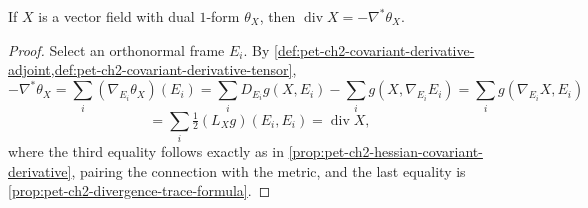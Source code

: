 \begin{proposition}
  \label{prop:pet-ch2-divergence-adjoint-formula}
  \leanok
  If $X$ is a vector field with dual $1$-form $\theta_X$, then
  $\operatorname{div}X=-\nabla^*\theta_X$.
\end{proposition}
\begin{proof}
  \leanok
  Select an orthonormal frame $E_i$. By
  \cref{def:pet-ch2-covariant-derivative-adjoint,def:pet-ch2-covariant-derivative-tensor},
  \[
    -\nabla^*\theta_X = \sum_i(\nabla_{E_i}\theta_X)(E_i)
    = \sum_iD_{E_i}g(X,E_i)-\sum_ig(X,\nabla_{E_i}E_i)
    = \sum_ig(\nabla_{E_i}X,E_i)
  \]
  \[
    = \sum_i\tfrac12(L_Xg)(E_i,E_i) = \operatorname{div}X,
  \]
  where the third equality follows exactly as in
  \cref{prop:pet-ch2-hessian-covariant-derivative}, pairing the connection
  with the metric, and the last equality is
  \cref{prop:pet-ch2-divergence-trace-formula}.
\end{proof}

